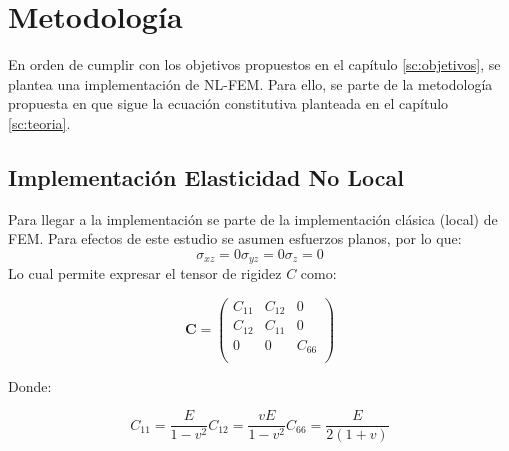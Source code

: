 \section{Metodología}
\label{sc:metodos}
	En orden de cumplir con los objetivos propuestos en el capítulo \ref{sc:objetivos}, se plantea una implementación de NL-FEM. Para ello, se parte de la metodología propuesta en \textit{} \parencite{Pisano2009} que sigue la ecuación constitutiva planteada en el capítulo \ref{sc:teoria}.
	\subsection{Implementación Elasticidad No Local}
	\label{sub:implementación}
	Para llegar a la implementación se parte de la implementación clásica (local) de FEM. Para efectos de este estudio se asumen esfuerzos planos, por lo que:
	\begin{subequations}
		\begin{equation}
			\sigma_{xz}=0
		\end{equation}
		\begin{equation}
			\sigma_{yz}=0
		\end{equation}
		\begin{equation}
			\sigma_{z}=0
		\end{equation}
	\end{subequations}
	Lo cual permite expresar el tensor de rigidez $C$ como:

	\begin{equation}
	\boldsymbol{C}=
		\begin{pmatrix}
			C_{11} & C_{12} & 0\\
			C_{12} & C_{11} & 0\\
			0 & 0 & C_{66}\\
		\end{pmatrix}
	\end{equation}

	Donde:

	\begin{subequations}
		\begin{equation}
			C_{11}=\frac{E}{1-v^2}
		\end{equation}
		\begin{equation}
			C_{12}=\frac{vE}{1-v^2}
		\end{equation}
		\begin{equation}
			C_{66}=\frac{E}{2(1+v)}
		\end{equation}
	\end{subequations}

